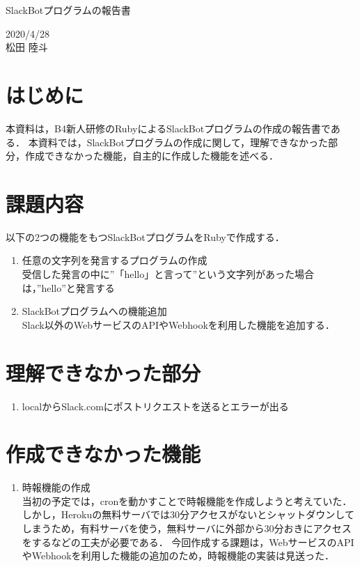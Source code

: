 \documentclass[12pt]{jsarticle}
\begin{document}
\begin{center}
{\LARGE SlackBotプログラムの報告書}
\end{center}

\begin{flushright}
  2020/4/28\\
  松田 陸斗
\end{flushright}
\section{はじめに}
\label{sec:introduction}
本資料は，B4新人研修のRubyによるSlackBotプログラムの作成の報告書である．
本資料では，SlackBotプログラムの作成に関して，理解できなかった部分，作成できなかった機能，自主的に作成した機能を述べる．

\section{課題内容}
以下の2つの機能をもつSlackBotプログラムをRubyで作成する．
\begin{enumerate}
\item 任意の文字列を発言するプログラムの作成\\
受信した発言の中に''「hello」と言って''という文字列があった場合は，''hello''と発言する
\item SlackBotプログラムへの機能追加\\
Slack以外のWebサービスのAPIやWebhookを利用した機能を追加する．
\end{enumerate}

\section{理解できなかった部分}
\begin{enumerate}
\item 	localからSlack.comにポストリクエストを送るとエラーが出る\\
\end{enumerate}

\section{作成できなかった機能}
\begin{enumerate}
\item 時報機能の作成\\
当初の予定では，cronを動かすことで時報機能を作成しようと考えていた．
しかし，Herokuの無料サーバでは30分アクセスがないとシャットダウンしてしまうため，有料サーバを使う，無料サーバに外部から30分おきにアクセスをするなどの工夫が必要である．
今回作成する課題は，WebサービスのAPIやWebhookを利用した機能の追加のため，時報機能の実装は見送った．
\end{enumerate}
\end{document}
